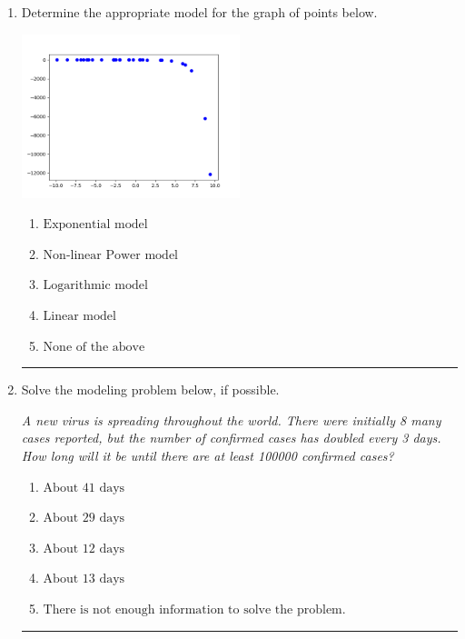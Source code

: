 \documentclass[14pt]{extbook}
\newcommand{\litem}[1]{\item#1\hspace*{-1cm}\rule{\textwidth}{0.4pt}}
\begin{document}
\begin{enumerate}
{\begin{enumerate}[label=\Alph*.]
\end{enumerate} }
\litem{
Determine the appropriate model for the graph of points below.
\begin{center}
    \includegraphics[width=0.5\textwidth]{../Figures/identifyModelGraph12CopyB.png}
\end{center}
\begin{enumerate}[label=\Alph*.]
\item \( \text{Exponential model} \)
\item \( \text{Non-linear Power model} \)
\item \( \text{Logarithmic model} \)
\item \( \text{Linear model} \)
\item \( \text{None of the above} \)

\end{enumerate} }
\litem{
Solve the modeling problem below, if possible.
\begin{center}
    \textit{ A new virus is spreading throughout the world. There were initially 8 many cases reported, but the number of confirmed cases has doubled every 3 days. How long will it be until there are at least 100000 confirmed cases? }
\end{center}
\begin{enumerate}[label=\Alph*.]
\item \( \text{About } 41 \text{ days} \)
\item \( \text{About } 29 \text{ days} \)
\item \( \text{About } 12 \text{ days} \)
\item \( \text{About } 13 \text{ days} \)
\item \( \text{There is not enough information to solve the problem.} \)


\end{enumerate}}
\end{enumerate}
\end{document}
